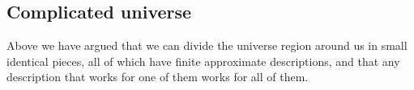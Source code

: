 \documentclass[a4paper
,draft
]{article}
\newcommand{\svn}[2][]{\todo[author=Virgil,color=red!25!white,#1]{#2}}
\def\reale{\mathbb{R}}
\newcommand{\ghilimele}[1]{``#1"}
\begin{document}







\subsection{Complicated universe}

Above we have argued that we can divide the universe region around us in small
identical pieces, all of which have finite approximate descriptions, and that
any description that works for one of them works for all of them.
\end{document}

